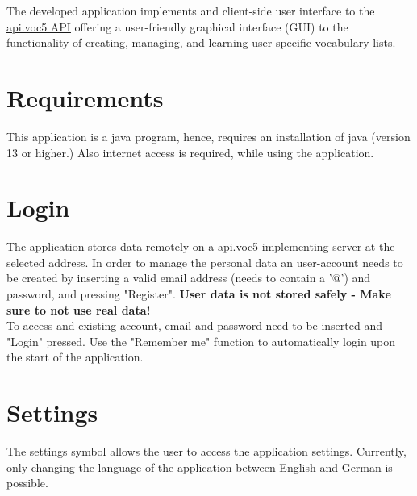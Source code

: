 

The developed application implements and client-side user interface to the \href{https://api.voc5.org/}{api.voc5 API} offering a user-friendly graphical interface (GUI) to the functionality of creating, managing, and learning user-specific vocabulary lists. 

    \section{Requirements}
    This application is a java program, hence, requires an installation of java (version 13 or higher.) Also internet access is required, while using the application. 

    \section{Login}
    The application stores data remotely on a api.voc5 implementing server at the selected address. In order to manage the personal data an user-account needs to be created by inserting a valid email address (needs to contain a '@') and password, and pressing "Register". \textbf{User data is not stored safely - Make sure to not use real data!} \\
    To access and existing account, email and password need to be inserted and "Login" pressed. Use the "Remember me" function to automatically login upon the start of the application. 

    \section{Settings}
    The settings symbol allows the user to access the application settings. Currently, only changing the language of the application between English and German is possible. 
    
